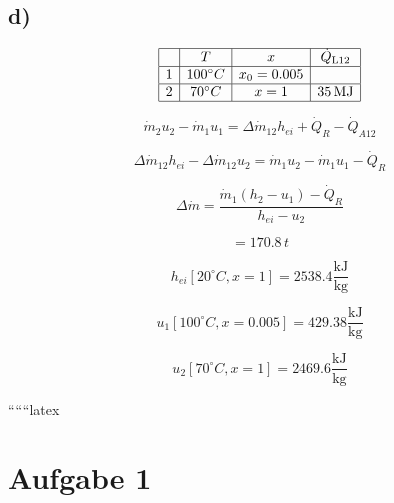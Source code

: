 

\subsection*{d)}

\[
\begin{array}{|c|c|c|c|}
\hline
 & T & x & \dot{Q}_{\text{L12}} \\
\hline
1 & 100^\circ C & x_0 = 0.005 & \\
\hline
2 & 70^\circ C & x = 1 & 35 \, \text{MJ} \\
\hline
\end{array}
\]

\[
\dot{m}_2 u_2 - \dot{m}_1 u_1 = \Delta \dot{m}_{12} h_{ei} + \dot{Q}_R - \dot{Q}_{A12}
\]

\[
\Delta \dot{m}_{12} h_{ei} - \Delta \dot{m}_{12} u_2 = \dot{m}_1 u_2 - \dot{m}_1 u_1 - \dot{Q}_R
\]

\[
\Delta \dot{m} = \frac{\dot{m}_1 (h_2 - u_1) - \dot{Q}_R}{h_{ei} - u_2}
\]

\[
= 170.8 \, t
\]

\[
h_{ei} [20^\circ C, x = 1] = 2538.4 \frac{\text{kJ}}{\text{kg}}
\]

\[
u_1 [100^\circ C, x = 0.005] = 429.38 \frac{\text{kJ}}{\text{kg}}
\]

\[
u_2 [70^\circ C, x = 1] = 2469.6 \frac{\text{kJ}}{\text{kg}}
\]

``````latex


\section*{Aufgabe 1}